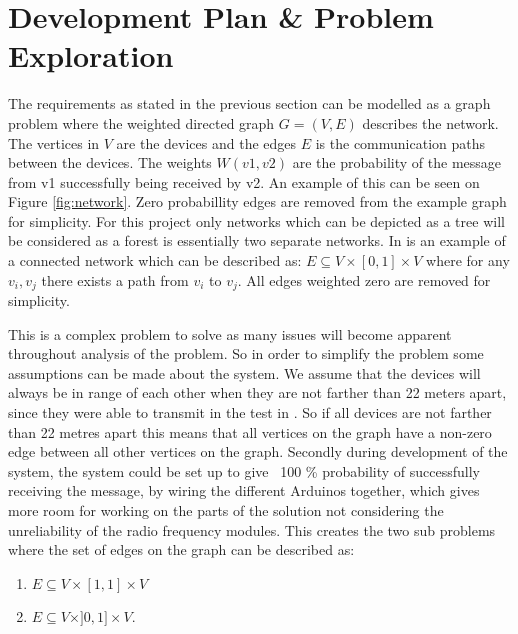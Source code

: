\section{Development Plan \& Problem Exploration}

\noindent The requirements as stated in the previous section can be modelled as a graph problem where the weighted directed graph $G = (V, E)$ describes the network. 
The vertices in $V$ are the devices and the edges $E$ is the communication paths between the devices. 
The weights $W(v1, v2)$ are the probability of the message from v1 successfully being received by v2.
An example of this can be seen on Figure \ref{fig:network}.
Zero probabillity edges are removed from the example graph for simplicity. 
For this project only networks which can be depicted as a tree will be considered as a forest is essentially two separate networks.
In  is an example of a connected network which can be described as: $E \subseteq V \times [0,1] \times V$ where for any $v_i, v_j$ there exists a path from $v_i$ to $v_j$.
All edges weighted zero are removed for simplicity.


\noindent This is a complex problem to solve as many issues will become apparent throughout analysis of the problem.
So in order to simplify the problem some assumptions can be made about the system.
We assume that the devices will always be in range of each other when they are not farther than 22 meters apart, since they were able to transmit in the test in  .
So if all devices are not farther than 22 metres apart this means that all vertices on the graph have a non-zero edge between all other vertices on the graph.
Secondly during development of the system, the system could be set up to give ~100 \% probability of successfully receiving the message, by wiring the different Arduinos together, which gives more room for working on the parts of the solution not considering the unreliability of the radio frequency modules. 
This creates the two sub problems where the set of edges on the graph can be described as: 

\begin{enumerate}
\item $E \subseteq V \times [1,1] \times V$
\item $E \subseteq V \times ]0,1] \times V$. 
\end{enumerate}

